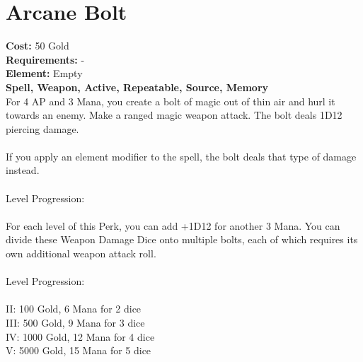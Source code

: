 \section{Arcane Bolt}
\textbf{Cost:} 50 Gold\\
\textbf{Requirements:} -\\
\textbf{Element:} Empty\\
\textbf{Spell, Weapon, Active, Repeatable, Source, Memory}\\
For 4 AP and 3 Mana, you create a bolt of magic out of thin air and hurl it towards an enemy. Make a ranged magic weapon attack. The bolt deals 1D12 piercing damage.\\
\\
If you apply an element modifier to the spell, the bolt deals that type of damage instead.\\
\\
Level Progression:\\
\\
For each level of this Perk, you can add +1D12 for another 3 Mana. You can divide these Weapon Damage Dice onto multiple bolts, each of which requires its own additional weapon attack roll.\\
\\
Level Progression:\\
\\
II: 100 Gold, 6 Mana for 2 dice\\
III: 500 Gold, 9 Mana for 3 dice\\
IV: 1000 Gold, 12 Mana for 4 dice\\
V: 5000 Gold, 15 Mana for 5 dice\\